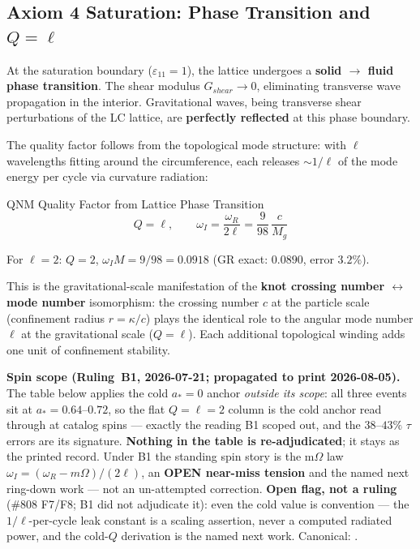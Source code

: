 \subsection{Axiom 4 Saturation: Phase Transition and $Q = \ell$}

At the saturation boundary ($\varepsilon_{11} = 1$), the lattice undergoes a \textbf{solid $\to$ fluid phase transition}. The shear modulus $G_{shear} \to 0$, eliminating transverse wave propagation in the interior. Gravitational waves, being transverse shear perturbations of the LC lattice, are \textbf{perfectly reflected} at this phase boundary.

The quality factor follows from the topological mode structure: with $\ell$ wavelengths fitting around the circumference, each releases $\sim 1/\ell$ of the mode energy per cycle via curvature radiation:
\begin{resultbox}{QNM Quality Factor from Lattice Phase Transition}
\begin{equation}
    Q = \ell, \qquad \omega_I = \frac{\omega_R}{2\ell} = \frac{9}{98}\,\frac{c}{M_g}
\end{equation}
\end{resultbox}
\noindent For $\ell = 2$: $Q = 2$, $\omega_I M = 9/98 = 0.0918$ (GR exact: $0.0890$, error $3.2\%$).

This is the gravitational-scale manifestation of the \textbf{knot crossing number $\leftrightarrow$ mode number} isomorphism: the crossing number $c$ at the particle scale (confinement radius $r = \kappa/c$) plays the identical role to the angular mode number $\ell$ at the gravitational scale ($Q = \ell$). Each additional topological winding adds one unit of confinement stability.

\noindent\textbf{Spin scope (Ruling~B1, 2026-07-21; propagated to print 2026-08-05).} The table below applies the cold $a_* = 0$ anchor \emph{outside its scope}: all three events sit at $a_* = 0.64$--$0.72$, so the flat $Q = \ell = 2$ column is the cold anchor read through at catalog spins --- exactly the reading B1 scoped out, and the $38$--$43\%$ $\tau$ errors are its signature. \textbf{Nothing in the table is re-adjudicated}; it stays as the printed record. Under B1 the standing spin story is the m$\Omega$ law $\omega_I = (\omega_R - m\Omega)/(2\ell)$, an \textbf{OPEN near-miss tension} and the named next ring-down work --- not an un-attempted correction. \textbf{Open flag, not a ruling} (\#808 F7/F8; B1 did not adjudicate it): even the cold value is convention --- the $1/\ell$-per-cycle leak constant is a scaling assertion, never a computed radiated power, and the cold-$Q$ derivation is the named next work. Canonical: .

